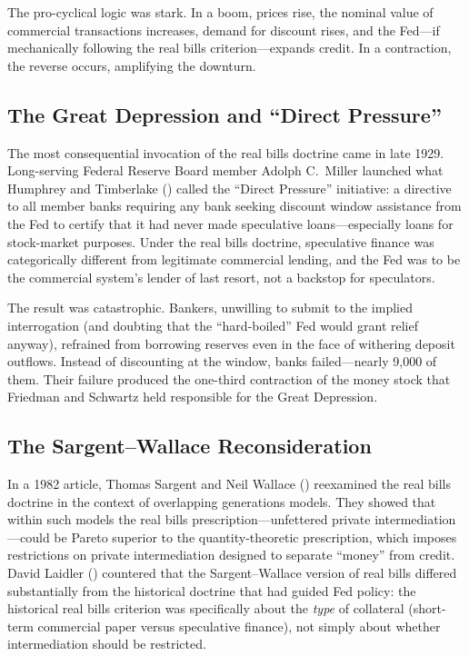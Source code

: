 \documentclass[12pt]{article}
\begin{document}
The pro-cyclical logic was stark.  In a boom, prices rise, the nominal value of
commercial transactions increases, demand for discount rises, and the Fed---if
mechanically following the real bills criterion---expands credit.  In a contraction,
the reverse occurs, amplifying the downturn.

\subsection{The Great Depression and ``Direct Pressure''}

The most consequential invocation of the real bills doctrine came in late 1929.
Long-serving Federal Reserve Board member Adolph C.\ Miller launched what Humphrey
and Timberlake (\citeyear{humphrey-timberlake2019}) called the ``Direct Pressure''
initiative: a directive to all member banks requiring any bank seeking discount
window assistance from the Fed to certify that it had never made speculative
loans---especially loans for stock-market purposes.  Under the real bills doctrine,
speculative finance was categorically different from legitimate commercial lending,
and the Fed was to be the commercial system's lender of last resort, not a
backstop for speculators.

The result was catastrophic.  Bankers, unwilling to submit to the implied
interrogation (and doubting that the ``hard-boiled'' Fed would grant relief
anyway), refrained from borrowing reserves even in the face of withering deposit
outflows.  Instead of discounting at the window, banks failed---nearly 9{,}000 of
them.  Their failure produced the one-third contraction of the money stock that
Friedman and Schwartz held responsible for the Great Depression.

\subsection{The Sargent--Wallace Reconsideration}

In a 1982 article, Thomas Sargent and Neil Wallace (\citeyear{sargent-wallace1982})
reexamined the real bills doctrine in the context of overlapping generations models.
They showed that within such models the real bills prescription---unfettered private
intermediation---could be Pareto superior to the quantity-theoretic prescription,
which imposes restrictions on private intermediation designed to separate ``money''
from credit.  David Laidler (\citeyear{laidler1984}) countered that the Sargent--Wallace
version of real bills differed substantially from the historical doctrine that had
guided Fed policy: the historical real bills criterion was specifically about the
\emph{type} of collateral (short-term commercial paper versus speculative finance),
not simply about whether intermediation should be restricted.
\end{document}
